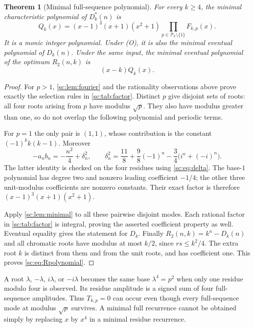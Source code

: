 \documentclass[11pt,a4paper]{article}
\numberwithin{equation}{section}
\newtheorem{theorem}{Theorem}[section]
\theoremstyle{definition}
\theoremstyle{remark}
\begin{document}
\begin{theorem}[Minimal full-sequence polynomial]\label{sc:thm:full}
For every $k\ge4$, the minimal characteristic polynomial of $D^*_k(n)$ is
\begin{equation}\label{sc:eq:Q}
 Q_k(x)=(x-1)^3(x+1)(x^2+1)
        \prod_{p\in\mathcal P_k\setminus\{1\}}F_{k,p}(x).
\end{equation}
It is a monic integer polynomial. Under (O), it is also the minimal
eventual polynomial of $D_k(n)$. Under the same input, the minimal eventual
polynomial of the optimum $R_2(n,k)$ is
\begin{equation}\label{sc:eq:Rpolynomial}
 (x-k)Q_k(x).
\end{equation}
\end{theorem}
\begin{proof}
For $p>1$, \cref{sc:lem:fourier} and the rationality observations above prove
exactly the selection rules in \cref{sc:tab:factor}. Distinct $p$ give disjoint
sets of roots: all four roots arising from $p$ have modulus $\sqrt p$.
They also have modulus greater than one, so do not overlap the following
polynomial and periodic terms.

For $p=1$ the only pair is $(1,1)$, whose contribution is the constant
$(-1)^kk(k-1)$. Moreover
\begin{equation}\label{sc:eq:deltasquare}
 -a_nb_n=-\frac{n^2}{4}+\delta_n^2,
 \qquad
 \delta_n^2=\frac{11}{8}+\frac98(-1)^n
               -\frac34\bigl(i^n+(-i)^n\bigr).
\end{equation}
The latter identity is checked on the four residues using
\eqref{sc:eq:delta}. The base-$1$ polynomial has degree two and nonzero
leading coefficient $-1/4$; the other three unit-modulus coefficients are
nonzero constants. Their exact factor is therefore
$(x-1)^3(x+1)(x^2+1)$.

Apply \cref{sc:lem:minimal} to all these pairwise disjoint modes.
Each rational factor in \cref{sc:tab:factor} is integral, proving the asserted
coefficient property as well. Eventual equality gives the statement for
$D_k$. Finally $R_2(n,k)=k^n-D_k(n)$ and all chromatic roots have modulus
at most $k/2$, since $rs\le k^2/4$. The extra root $k$ is distinct from
them and from the unit roots, and has coefficient one. This proves
\eqref{sc:eq:Rpolynomial}.
\end{proof}

\begin{remark}
A root $\lambda$, $-\lambda$, $i\lambda$, or $-i\lambda$ becomes the same
base $\lambda^4=p^2$ when only one residue modulo four is observed.
Its residue amplitude is a signed sum of four full-sequence amplitudes.
Thus $T_{k,p}=0$ can occur even though every full-sequence mode at modulus
$\sqrt p$ survives. A minimal full recurrence cannot be obtained simply by
replacing $x$ by $x^4$ in a minimal residue recurrence.
\end{remark}
\end{document}
